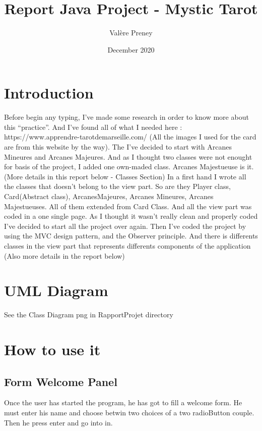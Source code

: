 \documentclass{article}
\author{Valère Preney}
\date{December 2020}
\title{Report Java Project - Mystic Tarot}
\begin{document}
\maketitle
\section{Introduction}\label{introduction}

Before begin any typing, I've made some research in order to know more about this ``practice''. And I've found all of what I needed here : https://www.apprendre-tarotdemarseille.com/ (All the images I used for the card are from this website by the way). The I've decided to start with Arcanes Mineures and Arcanes Majeures. And as I thought two classes
were not enought for basis of the project, I added one own-maded class. Arcanes Majestueuse is it.(More details in this report below - Classes Section) In a first hand I wrote all the classes that doesn't belong to the view part. So are they Player class, Card(Abstract class), ArcanesMajeures, Arcanes Mineures, Arcanes Majestueuses. All of them extended from Card Class. And all the view part was coded in a one single page. As I thought it wasn't really clean and properly coded I've decided to start all the project over again. Then I've coded the project by using the MVC design pattern, and the Observer principle. And there is differents classes in the view part that represents differents components of the application (Also more details in the report below)

\section{UML Diagram}\label{uml-diagram}

See the Class Diagram png in RapportProjet directory

\section{How to use it}\label{how-to-use-it}

\subsection{Form Welcome Panel}\label{form-welcome-panel}

Once the user has started the program, he has got to fill a welcome
form. He must enter his name and choose betwin two choices of a two
radioButton couple. Then he press enter and go into in.
\end{document}
